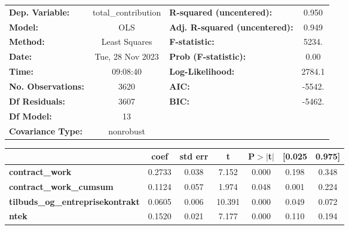 \begin{center}
\begin{tabular}{lclc}
\toprule
\textbf{Dep. Variable:}                  & total\_contribution & \textbf{  R-squared (uncentered):}      &     0.950   \\
\textbf{Model:}                          &         OLS         & \textbf{  Adj. R-squared (uncentered):} &     0.949   \\
\textbf{Method:}                         &    Least Squares    & \textbf{  F-statistic:       }          &     5234.   \\
\textbf{Date:}                           &   Tue, 28 Nov 2023  & \textbf{  Prob (F-statistic):}          &     0.00    \\
\textbf{Time:}                           &       09:08:40      & \textbf{  Log-Likelihood:    }          &    2784.1   \\
\textbf{No. Observations:}               &          3620       & \textbf{  AIC:               }          &    -5542.   \\
\textbf{Df Residuals:}                   &          3607       & \textbf{  BIC:               }          &    -5462.   \\
\textbf{Df Model:}                       &            13       & \textbf{                     }          &             \\
\textbf{Covariance Type:}                &      nonrobust      & \textbf{                     }          &             \\
\bottomrule
\end{tabular}
\begin{tabular}{lcccccc}
                                         & \textbf{coef} & \textbf{std err} & \textbf{t} & \textbf{P$> |$t$|$} & \textbf{[0.025} & \textbf{0.975]}  \\
\midrule
\textbf{contract\_work}                  &       0.2733  &        0.038     &     7.152  &         0.000        &        0.198    &        0.348     \\
\textbf{contract\_work\_cumsum}          &       0.1124  &        0.057     &     1.974  &         0.048        &        0.001    &        0.224     \\
\textbf{tilbuds\_og\_entreprisekontrakt} &       0.0605  &        0.006     &    10.391  &         0.000        &        0.049    &        0.072     \\
\textbf{ntek}                            &       0.1520  &        0.021     &     7.177  &         0.000        &        0.110    &        0.194     \\

\end{tabular}
\end{center}
